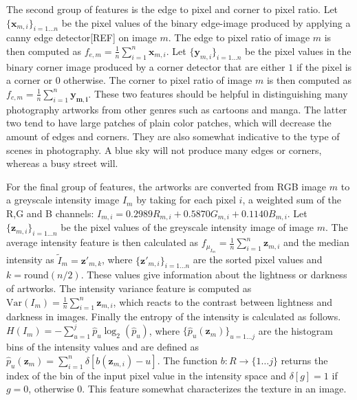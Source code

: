 The second group of features is the edge to pixel and corner to pixel ratio. Let $\{\mathbf{x}_{m,i} \}_{i=1\dots n}$ be the pixel values of the binary edge-image produced by applying a canny edge detector[REF] on image $m$. The edge to pixel ratio of image $m$ is then computed as $f_{e,m} = \frac{1}{n}\sum_{i=1}^{n} \mathbf{x}_{m,i} $. Let $\{\mathbf{y}_{m,i} \}_{i=1\dots n}$ be the pixel values in the binary corner image produced by a corner detector that are either $1$ if the pixel is a corner or $0$ otherwise. The corner to pixel ratio of image $m$ is then computed as  $f_{c,m} = \frac{1}{n}\sum_{i=1}^{n} \mathbf{y_{m,i}} $. These two features should be helpful in distinguishing many photography artworks from other genres such as cartoons and manga. The latter two tend to have large patches of plain color patches, which will decrease the amount of edges and corners. They are also somewhat indicative to the type of scenes in photography. A blue sky will not produce many edges or corners, whereas a busy street will.  


For the final group of features, the artworks are converted from RGB image $m$ to a greyscale intensity image $I_m$ by taking for each pixel $i$, a weighted sum of the R,G and B channels: $I_{m,i} = 0.2989R_{m,i} + 0.5870G_{m,i} + 0.1140B_{m,i} $. Let $\{\mathbf{z}_{m,i}\}_{i=1\dots n}$ be the pixel values of the greyscale intensity image of image $m$. The average intensity feature is then calculated as $f_{\mu_{I_m}} = \frac{1}{n} \sum_{i = 1}^{n} \mathbf{z}_{m,i}$ and the median intensity as $\tilde{I}_m = \mathbf{z'}_{m,k}$, where $\{\mathbf{z'}_{m,i}\}_{i = 1\dots n}$ are the sorted pixel values and $k = \mbox{round}(n/2)$. These values give information about the lightness or darkness of artworks. The intensity variance feature is computed as $\mbox{Var}(I_m) = \frac{1}{n} \sum_{i=1}^n \mathbf{z}_{m,i}$, which reacts to the contrast between lightness and darkness in images. Finally the entropy of the intensity is calculated as follows. $H(I_m) = -\sum_{u = 1}^{j} \hat{p}_u \log_2(\hat{p}_u) $, where $\{\hat{p}_u(\mathbf{z}_m)\}_{u = 1 \dots j}$ are the histogram bins of the intensity values and are defined as $\hat{p}_u(\mathbf{z}_m) = \sum_{i=1}^n \delta[b(\mathbf{z}_{m,i}) - u] $. The function $b : R \rightarrow \{1 \dots j \}$ returns the index of the bin of the input pixel value in the intensity space and $\delta[g] = 1$ if $g = 0$, otherwise $0$. This feature somewhat characterizes the texture in an image.  

